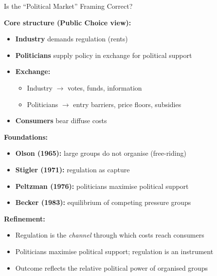 \documentclass[10pt]{beamer}
\begin{document}
\begin{frame}[allowframebreaks]{Is the “Political Market” Framing Correct?}
\small

\textbf{Core structure (Public Choice view):}
\begin{itemize}
\item \textbf{Industry} demands regulation (rents)
\item \textbf{Politicians} supply policy in exchange for political support
\item \textbf{Exchange:}
\begin{itemize}
\item Industry $\rightarrow$ votes, funds, information
\item Politicians $\rightarrow$ entry barriers, price floors, subsidies
\end{itemize}
\item \textbf{Consumers} bear diffuse costs
\end{itemize}


\textbf{Foundations:}
\begin{itemize}
\item \textbf{Olson (1965):} large groups do not organise (free-riding)
\item \textbf{Stigler (1971):} regulation as capture
\item \textbf{Peltzman (1976):} politicians maximise political support
\item \textbf{Becker (1983):} equilibrium of competing pressure groups
\end{itemize}


\textbf{Refinement:}
\begin{itemize}
\item Regulation is the \emph{channel} through which costs reach consumers
\item Politicians maximise political support; regulation is an instrument
\item Outcome reflects the relative political power of organised groups
\end{itemize}

\end{frame}
\end{document}
